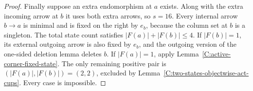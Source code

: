 \begin{proof}
Finally suppose an extra endomorphism at $a$ exists. Along with
the extra incoming arrow at $b$ it uses both extra arrows, so
$s=16$. Every internal arrow $b\to a$ is minimal and is fixed
on the right by $e_b$, because the column set at $b$ is a singleton.
The total state count satisfies $|F(a)|+|F(b)|\leq4$.
If $|F(b)|=1$, its external outgoing arrow is also fixed by
$e_b$, and the outgoing version of the one-sided deletion lemma
deletes $b$. If $|F(a)|=1$, apply
Lemma~\ref{C:active-corner-fixed-state}.
The only remaining positive pair is $(|F(a)|,|F(b)|)=(2,2)$,
excluded by Lemma~\ref{C:two-states-objectwise-act-cups}.
Every case is impossible.
\end{proof}
